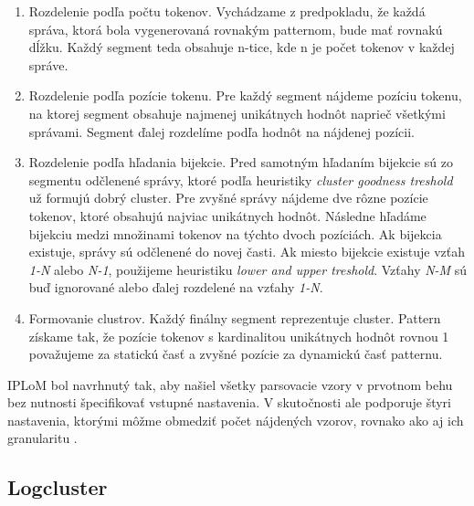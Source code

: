 \begin{enumerate}
  \item Rozdelenie podľa počtu tokenov. Vychádzame z predpokladu, že každá správa, ktorá bola vygenerovaná rovnakým patternom, bude mať rovnakú dĺžku. Každý segment teda obsahuje n-tice, kde n je počet tokenov v každej správe.
  \item Rozdelenie podľa pozície tokenu. Pre každý segment nájdeme pozíciu tokenu, na ktorej segment obsahuje najmenej unikátnych hodnôt naprieč všetkými správami. Segment ďalej rozdelíme podľa hodnôt na nájdenej pozícii.
  \item Rozdelenie podľa hľadania bijekcie. Pred samotným hľadaním bijekcie sú zo segmentu odčlenené správy, ktoré podľa heuristiky \emph{cluster goodness treshold} už formujú dobrý cluster. Pre zvyšné správy nájdeme dve rôzne pozície tokenov, ktoré obsahujú najviac unikátnych hodnôt. Následne hľadáme bijekciu medzi množinami tokenov na týchto dvoch pozíciách. Ak bijekcia existuje, správy sú odčlenené do novej časti. Ak miesto bijekcie existuje vzťah \emph{1-N} alebo \emph{N-1}, použijeme heuristiku \emph{lower and upper treshold}. Vzťahy \emph{N-M} sú buď ignorované alebo ďalej rozdelené na vzťahy \emph{1-N}.
  \item Formovanie clustrov. Každý finálny segment reprezentuje cluster. Pattern získame tak, že pozície tokenov s kardinalitou unikátnych hodnôt rovnou 1 považujeme za statickú časť a zvyšné pozície za dynamickú časť patternu.
\end{enumerate}

IPLoM bol navrhnutý tak, aby našiel všetky parsovacie vzory v prvotnom behu bez nutnosti špecifikovať vstupné nastavenia. V skutočnosti ale podporuje štyri nastavenia, ktorými môžme obmedziť počet nájdených vzorov, rovnako ako aj ich granularitu \parencite{nagappanvouk}.

\subsection{Logcluster}

